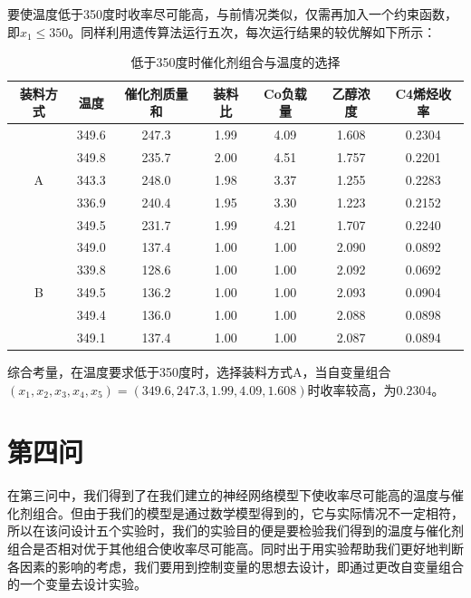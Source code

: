 \documentclass{article}
\begin{document}
	要使温度低于350度时收率尽可能高，与前情况类似，仅需再加入一个约束函数，即$x_1\leq 350$。同样利用遗传算法运行五次，每次运行结果的较优解如下所示：
	\begin{table}[!h]
		\centering
		\caption{低于350度时催化剂组合与温度的选择}
		\begin{tabular}{|c|c|c|c|c|c|c|}
			\hline
			装料方式               & 温度    & 催化剂质量和 & 装料比 & Co负载量 & 乙醇浓度  & C4烯烃收率 \\ \hline
			\multirow{5}{*}{A} & 349.6 & 247.3  & 1.99           & 4.09  & 1.608 & 0.2304 \\ \cline{2-7} 
			& 349.8 & 235.7  & 2.00           & 4.51  & 1.757 & 0.2201 \\ \cline{2-7} 
			& 343.3 & 248.0  & 1.98           & 3.37  & 1.255 & 0.2283 \\ \cline{2-7} 
			& 336.9 & 240.4  & 1.95           & 3.30  & 1.223 & 0.2152 \\ \cline{2-7} 
			& 349.5 & 231.7  & 1.99           & 4.21  & 1.707 & 0.2240 \\ \hline
			\multirow{5}{*}{B} & 349.0 & 137.4  & 1.00           & 1.00  & 2.090 & 0.0892 \\ \cline{2-7} 
			& 339.8 & 128.6  & 1.00           & 1.00  & 2.092 & 0.0692 \\ \cline{2-7} 
			& 349.5 & 136.2  & 1.00           & 1.00  & 2.093 & 0.0904 \\ \cline{2-7} 
			& 349.4 & 136.0  & 1.00           & 1.00  & 2.088 & 0.0898 \\ \cline{2-7} 
			& 349.1 & 137.4  & 1.00           & 1.00  & 2.087 & 0.0894 \\ \hline
		\end{tabular}
	\end{table}

	综合考量，在温度要求低于350度时，选择装料方式A，当自变量组合$(x_1,x_2,x_3,x_4,x_5)=(349.6,247.3,1.99,4.09,1.608)$时收率较高，为$0.2304$。
	\section{第四问}
	在第三问中，我们得到了在我们建立的神经网络模型下使收率尽可能高的温度与催化剂组合。但由于我们的模型是通过数学模型得到的，它与实际情况不一定相符，所以在该问设计五个实验时，我们的实验目的便是要检验我们得到的温度与催化剂组合是否相对优于其他组合使收率尽可能高。同时出于用实验帮助我们更好地判断各因素的影响的考虑，我们要用到控制变量的思想去设计，即通过更改自变量组合的一个变量去设计实验。
	
\end{document}
